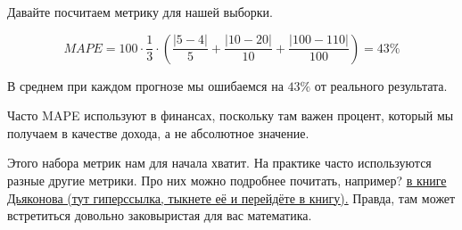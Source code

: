 \documentclass[12pt, a4paper, oneside]{article}
\theoremstyle{plain} %
\theoremstyle{definition}
\begin{document}
\begin{solution}
\begin{itemize}
Давайте посчитаем метрику для нашей выборки.

$$
MAPE = 100\cdot \frac{1}{3} \cdot\left( \frac{|5 - 4|}{5} + \frac{|10 -20|}{10} + \frac{|100 - 110|}{100} \right) =  43 \% 
$$

В среднем при каждом прогнозе мы ошибаемся на $43\%$ от реального результата.

Часто MAPE используют в финансах, поскольку там важен процент, который мы получаем в качестве дохода, а не абсолютное значение. 

\begin{center}
\end{center}

Этого набора метрик нам для начала хватит. На практике часто используются разные другие метрики. Про них можно подробнее почитать, например? \href{https://alexanderdyakonov.files.wordpress.com/2018/10/book_08_metrics_12_blog1.pdf}{в книге Дьяконова (тут гиперссылка, тыкнете её и перейдёте в книгу).} Правда, там может встретиться довольно заковыристая для вас математика.
\end{itemize} 
\end{solution}
\end{document}

